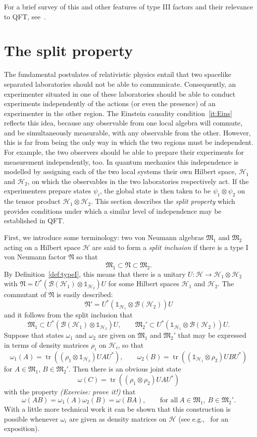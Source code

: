 \documentclass[12pt,a4paper]{article}
\newcommand{\1}{\mathds{1}}                         %
\newcommand{\BB}{{\mathcal{B}}}
\newcommand{\HH}{{\mathcal{H}}}
\newcommand{\Mf}{{\mathfrak{M}}}
\newcommand{\Nf}{{\mathfrak{N}}}
\newcommand{\II}{{\mathbb{1}}}
\DeclareMathOperator{\tr}{tr}
\begin{document}
For a brief survey of this and other features of type III factors and their relevance to QFT, see~\cite{Yngvason:2005,Yngvason:2015}. 

 
\section{The split property}\label{sec:split}

The fundamental postulates of relativistic physics entail that two spacelike separated laboratories should not be able to communicate. Consequently,
an experimenter situated in one of these laboratories should be able to conduct experiments independently of the actions (or even the presence) of an experimenter in the other region. The Einstein causality condition~\ref{it:Eins} reflects this idea, because any observable
from one local algebra will commute, and be simultaneously measurable, with any observable from the other.  However, this is far from being the only way in which the two regions must be independent. For example, the two observers should be able to prepare their experiments for measurement independently, too.
In quantum mechanics this independence is modelled by assigning each of the two local systems their own Hilbert space, $\HH_1$ and $\HH_2$, on which the observables in the two laboratories respectively act. If the experimenters prepare states $\psi_i$, the global state is then taken to be $\psi_1\otimes\psi_2$ on the tensor product $\HH_1\otimes\HH_2$. 
This section describes the \emph{split property} which provides conditions under which a similar level of independence may be established in QFT.

First, we introduce some terminology: two von Neumann algebras $\Mf_1$ and $\Mf_2$ acting on a Hilbert space $\HH$ are said to form a \emph{split inclusion} if there is a type I von Neumann factor $\Nf$ so that
\[
\Mf_1\subset \Nf\subset \Mf_2.
\]
By Definition~\ref{def:typeI}, this means that there is a unitary $U:\HH\to \HH_1\otimes\HH_2$ with $\Nf = U^* (\BB(\HH_1)\otimes\II_{\HH_2})U$ for some Hilbert spaces $\HH_1$ and $\HH_2$. The commutant of $\Nf$ is easily described:
\[
\Nf' = U^* (\II_{\HH_1}\otimes\BB(\HH_2))U
\]
and it follows from the split inclusion that
\[
\Mf_1\subset  U^* (\BB(\HH_1)\otimes\II_{\HH_2})U,\qquad   \Mf_2' \subset U^* (\II_{\HH_1}\otimes\BB(\HH_2))U.
\]
Suppose that states $\omega_1$ and $\omega_2$ are given on $\Mf_1$ and $\Mf_2'$ that may be expressed in terms of density matrices $\rho_i$ on $\HH_i$, so that
\[
\omega_1(A)= \tr ((\rho_1\otimes\II_{\HH_2})UAU^*), \qquad \omega_2(B)= \tr ((\II_{\HH_1}\otimes\rho_2)UBU^*)
\]
for $A\in\Mf_1$, $B\in\Mf_2'$. Then there is an obvious joint state
\[
\omega(C) = \tr ((\rho_1\otimes\rho_2)UAU^*)
\]
with the property \emph{(Exercise: prove it!)} that
\[
\omega(AB)= \omega_1(A)\omega_2(B) = \omega(BA), \qquad \text{for all}~A\in\Mf_1, ~B\in\Mf_2'.
\]
With a little more technical work it can be shown that this construction is possible whenever $\omega_i$ are given as density matrices on $\HH$ (see e.g.,~\cite{Fewster_Abh:2016} for an exposition). 
\end{document}
